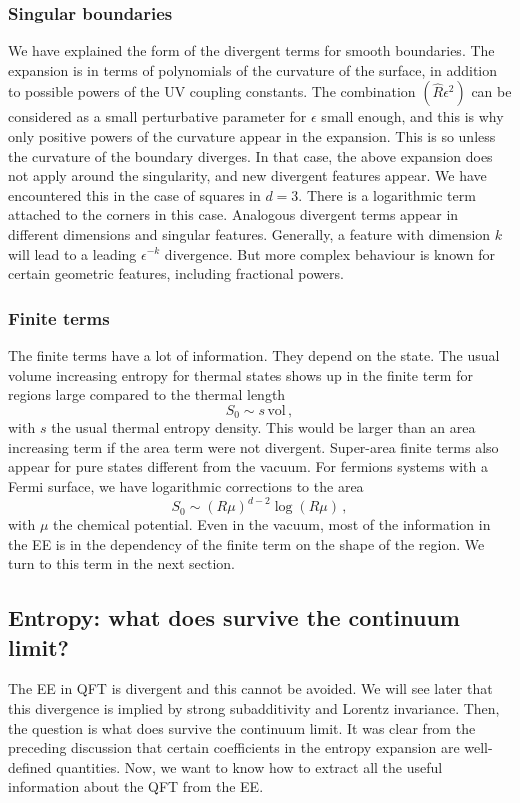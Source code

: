 \documentclass[12pt]{article}
\numberwithin{equation}{section}
\newcommand{\be}{\begin{equation}}
\newcommand{\ee}{\end{equation}}
\begin{document}
\subsubsection*{Singular boundaries}
We have explained the form of the divergent terms for smooth boundaries. 
The expansion is in terms of polynomials of the curvature of the surface, in addition to possible powers of the UV coupling constants. 
 The combination $(\hat{R}\epsilon^2)$ can be considered as a small perturbative parameter for $\epsilon$ small enough, and this is why only positive powers of the curvature appear in the expansion.  This is so unless the curvature of the boundary diverges. In that case, the above expansion does not apply around the singularity, and new divergent features appear.
 We have encountered this in the case of squares in $d=3$. There is a logarithmic term attached to the corners in this case. Analogous divergent terms appear in different dimensions and singular features. Generally, a feature with dimension $k$ will lead to a leading $\epsilon^{-k}$ divergence. But more complex behaviour is known for certain geometric features, including fractional powers.  

\subsubsection*{Finite terms}

The finite terms have a lot of information. They depend on the state. The usual volume increasing entropy for thermal states shows up in the finite term for regions large compared to the thermal length
\be
S_0\sim s\,\textrm{vol}\,,  
\ee
with $s$ the usual thermal entropy density. This would be larger than an area increasing term if the area term were not divergent. Super-area finite terms also appear for pure states different from the vacuum. For fermions systems with a Fermi surface, we have logarithmic corrections to the area 
\be
S_0\sim (R\mu)^{d-2} \log(R \mu)\,,  
\ee
with $\mu$ the chemical potential. Even in the vacuum, most of the information in the EE is in the dependency of the finite term on the shape of the region.   
We turn to this term in the next section. 

\subsection{Entropy: what does survive the continuum limit?}
\label{regent}


The EE in QFT is divergent and this cannot be avoided. We will see later that this divergence is implied by strong subadditivity and Lorentz invariance. Then, the question is what does survive the continuum limit. It was clear from the preceding discussion that certain coefficients in the entropy expansion are well-defined quantities. Now, we want to know how to extract all the useful information about the QFT from the EE.
  
\end{document}
